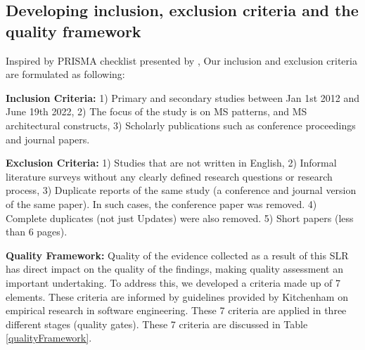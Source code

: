\documentclass[a4paper,11pt,article,oneside]{memoir}
\begin{document}

    


\subsection{Developing inclusion, exclusion criteria and the quality framework}

Inspired by PRISMA checklist presented by \citet{tricco2018prisma}, Our inclusion and exclusion criteria are formulated as following:

\textbf{Inclusion Criteria:} 1) Primary and secondary studies between Jan 1st 2012 and June 19th 2022, 2) The focus of the study is on MS patterns, and MS architectural constructs, 3) Scholarly publications such as conference proceedings and journal papers.

\textbf{Exclusion Criteria:} 1) Studies that are not written in English, 2) Informal literature surveys without any clearly defined research questions or research process, 3) Duplicate reports of the same study (a conference and journal version of the same paper). In such cases, the conference paper was removed. 4) Complete duplicates (not just Updates) were also removed. 5) Short papers (less than 6 pages).

\textbf{Quality Framework:} Quality of the evidence collected as a result of this SLR has direct impact on the quality of the findings, making quality assessment an important undertaking. To address this, we developed a criteria made up of 7 elements. These criteria are informed by guidelines provided by Kitchenham \citet{Kitchenham.2004} on empirical research in software engineering. These 7 criteria are applied in three different stages (quality gates). These 7 criteria are discussed in Table \ref{qualityFramework}.
\end{document}
